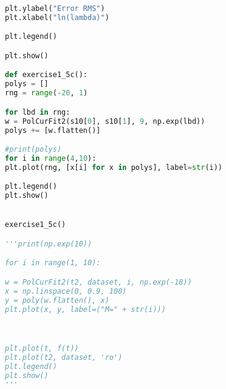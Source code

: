 \documentclass{article}
\begin{document}
\begin{lstlisting}[language=python]
plt.ylabel("Error RMS")
plt.xlabel("ln(lambda)")

plt.legend()

plt.show()

def exercise1_5c():
polys = []
rng = range(-20, 1)

for lbd in rng:
w = PolCurFit2(s10[0], s10[1], 9, np.exp(lbd))
polys += [w.flatten()]

#print(polys)
for i in range(4,10):
plt.plot(rng, [x[i] for x in polys], label=str(i))

plt.legend()
plt.show()


exercise1_5c()

'''print(np.exp(10))

for i in range(1, 10):

w = PolCurFit2(t2, dataset, i, np.exp(-18))
x = np.linspace(0, 0.9, 100)
y = poly(w.flatten(), x)
plt.plot(x, y, label=("M=" + str(i)))



plt.plot(t, f(t))
plt.plot(t2, dataset, 'ro')
plt.legend()
plt.show()
'''

\end{lstlisting}
\end{document}
